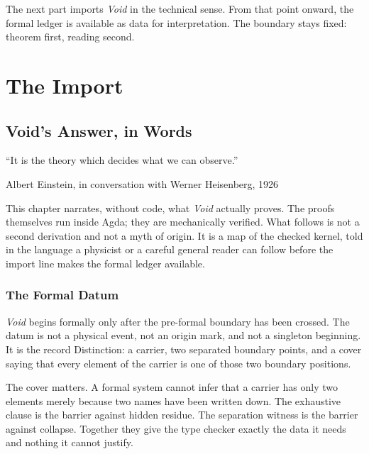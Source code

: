 \documentclass[11pt,a4paper]{book}
\def\texttt#1{#1}%
\begin{document}
The next part imports \textit{Void} in the technical sense. From that point onward, the formal ledger is available as data for interpretation. The boundary stays fixed: theorem first, reading second.






\part*{The Import}

\chapter{Void's Answer, in Words}
\label{ch:voids-answer}

\epigraph{``It is the theory which decides what we can observe.''}{Albert Einstein, in conversation with Werner Heisenberg, 1926}

This chapter narrates, without code, what \textit{Void} actually proves. The proofs themselves run inside Agda; they are mechanically verified. What follows is not a second derivation and not a myth of origin. It is a map of the checked kernel, told in the language a physicist or a careful general reader can follow before the import line makes the formal ledger available.

\section*{The Formal Datum}

\textit{Void} begins formally only after the pre-formal boundary has been crossed. The datum is not a physical event, not an origin mark, and not a singleton beginning. It is the record \texttt{Distinction}: a carrier, two separated boundary points, and a cover saying that every element of the carrier is one of those two boundary positions.

The cover matters. A formal system cannot infer that a carrier has only two elements merely because two names have been written down. The exhaustive clause is the barrier against hidden residue. The separation witness is the barrier against collapse. Together they give the type checker exactly the data it needs and nothing it cannot justify.
\end{document}
